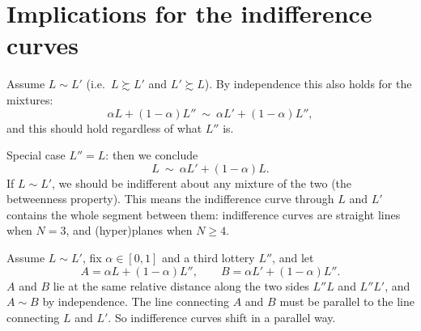 \documentclass[11pt]{article}
\begin{document}
\section{Implications for the indifference curves}

Assume $L\sim L'$ (i.e.\ $L\succsim L'$ and $L'\succsim L$). By independence this also
holds for the mixtures:
\[ \alpha L+(1-\alpha)L''\ \sim\ \alpha L'+(1-\alpha)L'', \]
and this should hold regardless of what $L''$ is.

Special case $L''=L$: then we conclude
\[ L\ \sim\ \alpha L'+(1-\alpha)L. \]
If $L\sim L'$, we should be indifferent about any mixture of the two (the betweenness
property). This means the indifference curve through $L$ and $L'$ contains the whole
segment between them: indifference curves are straight lines when $N=3$, and
(hyper)planes when $N\ge 4$.

Assume $L\sim L'$, fix $\alpha\in[0,1]$ and a third lottery $L''$, and let
\[ A=\alpha L+(1-\alpha)L'',\qquad B=\alpha L'+(1-\alpha)L''. \]
$A$ and $B$ lie at the same relative distance along the two sides $L''L$ and
$L''L'$, and $A\sim B$ by independence. The line connecting $A$ and $B$ must be
parallel to the line connecting $L$ and $L'$. So indifference curves shift in a
parallel way.

\begin{center}
\end{center}
\end{document}
